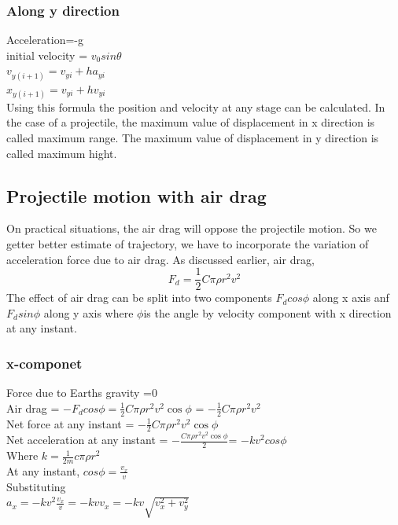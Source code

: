\documentclass[12pt,a4paper]{article}
\begin{document}
	\subsubsection{Along y direction}
	Acceleration=-g\\
	initial velocity = \(v_0 sin \theta\)\\
	\(v_{y(i+1)}=v_{yi}+ha_{yi}\)\\
	\(x_{y(i+1)}=v_{yi}+hv_{yi}\)\\


	Using this formula the position and velocity at any stage can be calculated. In the case of a projectile, the maximum value of displacement in x direction is called maximum range. The maximum value of displacement in y direction is called maximum hight.
	
	\subsection{Projectile motion with air drag}
	On practical situations, the air drag will oppose the projectile motion. So we getter better estimate of trajectory, we have to incorporate the variation of acceleration force due to air drag. As discussed earlier, air drag,
	\begin{equation}
		F_d=\frac{1}{2}C\pi \rho r^2 v^2 
	\end{equation}
	The effect of air drag can be split into two components \(F_d cos \phi \) along x axis anf \(F_d sin \phi \) along y axis where \(\phi \)is the angle by velocity component with x direction at any instant.
	\subsubsection{x-componet }
		Force due to Earths gravity =0\\
		Air drag = \(-F_d cos \phi = \frac{1}{2}C\pi \rho r^2 v^2 \cos \phi \) = \(-\frac{1}{2}C\pi \rho r^2 v^2 \)\\
		Net force at any instant = \(-\frac{1}{2}C\pi \rho r^2 v^2 \cos \phi \)\\
		Net acceleration at any instant = \(-\frac{C\pi \rho r^2 v^2 \cos \phi }{2}\)= \(-kv^2 cos \phi \) \\
		Where \(k=\frac{1}{2m}c\pi \rho r^2\)\\
		At any instant, \(cos \phi = \frac{v_x}{v}\)\\
		Substituting \\
		\(a_x=-kv^2\frac{v_x}{v}=-kvv_x=-kv\sqrt{v_x^2+v_y^2}\)
\end{document}
